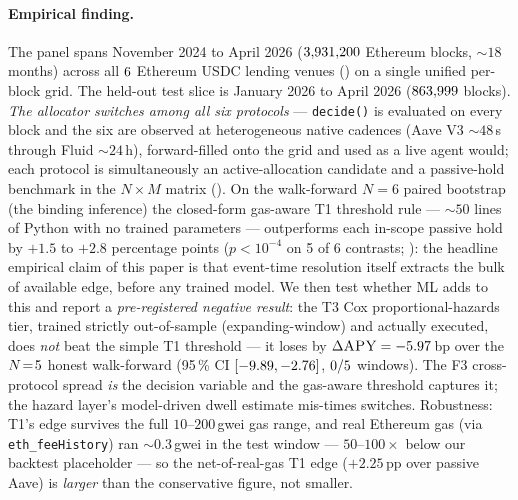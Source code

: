 \paragraph{Empirical finding.}
The panel spans November 2024 to April 2026 ($3{,}931{,}200$ Ethereum
blocks, $\sim 18$ months) across all $6$ Ethereum USDC
lending venues (\ProtocolList) on a single unified per-block grid.
The held-out test slice is January 2026 to April 2026 ($863{,}999$
blocks).  \emph{The allocator switches among all six protocols} ---
\texttt{decide()} is evaluated on every block and the six are
observed at heterogeneous native cadences (Aave V3 $\sim 48$\,s
through Fluid $\sim 24$\,h), forward-filled onto the grid and used as
a live agent would; each protocol is simultaneously an
active-allocation candidate and a passive-hold benchmark in the
$N\!\times\!M$ matrix ().  On the
walk-forward $N\!=\!6$ paired
bootstrap (the binding inference) the closed-form gas-aware T1
threshold rule --- $\sim 50$ lines of Python with no trained
parameters --- outperforms each in-scope passive hold by $+1.5$ to
$+2.8$ percentage points ($p<10^{-4}$ on 5 of 6 contrasts;
): the headline empirical claim of this paper is
that event-time resolution itself extracts the bulk of available
edge, before any trained model.  We then test whether ML adds to
this and report a \emph{pre-registered negative result}: the T3
Cox proportional-hazards tier, trained strictly out-of-sample
(expanding-window) and actually executed, does \emph{not} beat the
simple T1 threshold --- it loses by $\Delta\textsc{APY} =
-5.97$\,bp over the $N\!=\!5$ honest
walk-forward (95\,\% CI $[-9.89, -2.76]$,
$0/5$ windows).  The F3 cross-protocol
spread \emph{is} the decision variable and the gas-aware threshold
captures it; the hazard layer's model-driven dwell estimate
mis-times switches.  Robustness: T1's edge survives the full
$10$--$200$\,gwei gas range, and real Ethereum gas
(via \texttt{eth\_feeHistory}) ran $\sim 0.3$\,gwei in the test
window --- $50$--$100\times$ below our backtest placeholder --- so
the net-of-real-gas T1 edge ($+2.25$\,pp over passive Aave) is
\emph{larger} than the conservative figure, not smaller.

